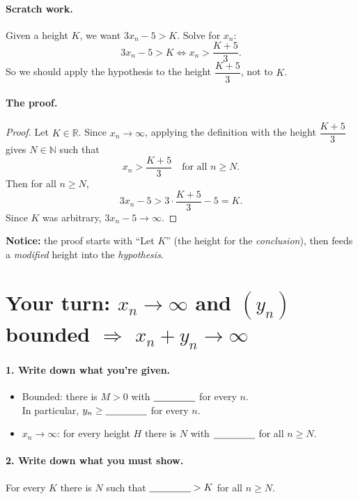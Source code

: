 \documentclass[11pt]{article}
\newcommand{\blank}{\underline{\hspace{1.5cm}}}
\begin{document}
\paragraph{Scratch work.} Given a height $K$, we want $3x_n-5>K$. Solve
for $x_n$:
\[
  3x_n - 5 > K \iff x_n > \frac{K+5}{3}.
\]
So we should apply the hypothesis to the height $\dfrac{K+5}{3}$, not to
$K$.

\paragraph{The proof.}
\begin{proof}
Let $K\in\mathbb{R}$. Since $x_n\to\infty$, applying the definition with
the height $\dfrac{K+5}{3}$ gives $N\in\mathbb{N}$ such that
\[
  x_n > \frac{K+5}{3} \quad\text{for all } n\ge N .
\]
Then for all $n\ge N$,
\[
  3x_n - 5 > 3\cdot\frac{K+5}{3} - 5 = K .
\]
Since $K$ was arbitrary, $3x_n-5\to\infty$.
\end{proof}

\noindent\textbf{Notice:} the proof starts with ``Let $K$'' (the height
for the \emph{conclusion}), then feeds a \emph{modified} height into the
\emph{hypothesis}.

\newpage
\section*{Your turn: $x_n\to\infty$ and $(y_n)$ bounded $\Rightarrow$ $x_n+y_n\to\infty$}

\paragraph{1. Write down what you're given.}
\begin{itemize}
  \item Bounded: there is $M>0$ with $\blank$ for every $n$. \\
        In particular, $y_n \ge \blank$ for every $n$.
  \item $x_n\to\infty$: for every height $H$ there is $N$ with
        $\blank$ for all $n\ge N$.
\end{itemize}

\paragraph{2. Write down what you must show.}
For every $K$ there is $N$ such that $\blank > K$ for all $n\ge N$.
\end{document}
